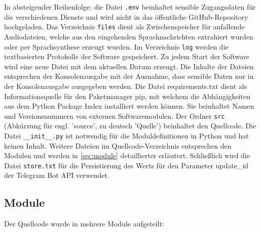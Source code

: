 In absteigender Reihenfolge: die Datei \lstinline{.env} beinhaltet sensible Zugangsdaten für die verschiedenen Dienste und wird nicht in das öffentliche GitHub-Repository hochgeladen. Das Verzeichnis \lstinline{files} dient als Zwischenspeicher für anfallende Audiodateien, welche aus den eingehenden Sprachnachrichten extrahiert wurden oder per Sprachsynthese erzeugt wurden. Im Verzeichnis \lstinline{log} werden die textbasierten Protokolle der Software gespeichert. Zu jedem Start der Software wird eine neue Datei mit dem aktuellen Datum erzeugt. Die Inhalte der Dateien entsprechen der Konsolenausgabe mit der Ausnahme, dass sensible Daten nur in der Konsolenausgabe ausgegeben werden. Die Datei requirements.txt dient als Informationsquelle für den Paketmanager pip, mit welchem die Abhängigkeiten aus dem Python Package Index installiert werden können. Sie beinhaltet Namen und Versionsnummern von externen Softwaremodulen. Der Ordner \lstinline{src} (Abkürzung für engl. 'source', zu deutsch 'Quelle') beinhaltet den Quellcode. Die Datei \lstinline{__init__.py} ist notwendig für die Moduldefinitionen in Python und hat keinen Inhalt. Weitere Dateien im Quellcode-Verzeichnis entsprechen den Modulen und werden in \autoref{sec:module} detaillierter erläutert. Schließlich wird die Datei \lstinline{store.txt} für die Persistierung des Werts für den Parameter update\_id der Telegram Bot API verwendet.

\subsection{Module}
\label{sec:module}

Der Quellcode wurde in mehrere Module aufgeteilt:

